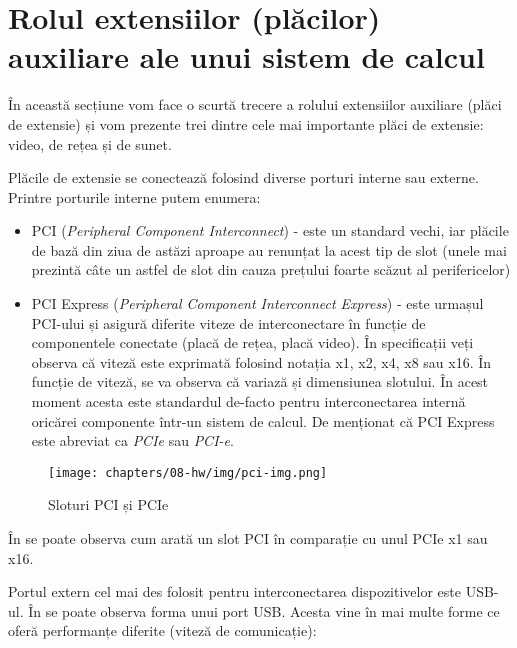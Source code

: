 \section{Rolul extensiilor (plăcilor) auxiliare ale unui sistem de calcul}
\label{sec:hw:extension}

În această secțiune vom face o scurtă trecere a rolului extensiilor auxiliare
(plăci de extensie) și vom prezente trei dintre cele mai importante plăci de
extensie: video, de rețea și de sunet.

Plăcile de extensie se conectează folosind diverse porturi interne sau externe.
Printre porturile interne putem enumera:

\begin{itemize}
  \item PCI 
          (\textit{Peripheral Component Interconnect}) - este un standard
          vechi, iar plăcile de bază din ziua de astăzi aproape au
          renunțat la acest tip de slot (unele mai prezintă câte un astfel
          de slot din cauza prețului foarte scăzut al perifericelor)
  \item PCI Express (\textit{Peripheral Component Interconnect Express}) -
          este urmașul PCI-ului și asigură diferite viteze de
          interconectare în funcție de componentele conectate (placă de
          rețea, placă video). În specificații veți observa că viteză
          este exprimată folosind notația x1, x2, x4, x8 sau x16. În
          funcție de viteză, se va observa că variază și dimensiunea
          slotului. În acest moment acesta este standardul de-facto pentru
          interconectarea internă oricărei componente într-un sistem de
          calcul. De menționat că PCI Express este abreviat ca
          \textit{PCIe} sau \textit{PCI-e}.
\end{itemize}

\begin{figure}[!htbp]
  \centering
  \texttt{[image: chapters/08-hw/img/pci-img.png]}
  \caption{Sloturi PCI și PCIe\protect\footnotemark}
  \label{fig:hw:pci}
\end{figure}

În  se poate observa cum arată un slot PCI în
comparație cu unul PCIe x1 sau x16.

Portul extern cel mai des folosit pentru interconectarea dispozitivelor este
USB-ul. În  se poate observa forma unui port USB. Acesta vine în mai
multe forme ce oferă performanțe diferite (viteză de comunicație):

